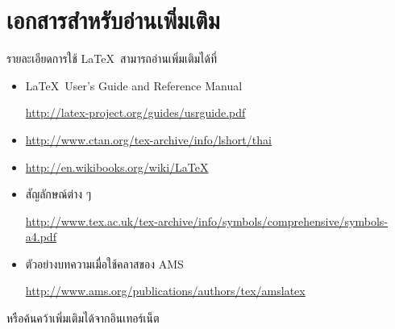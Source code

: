\section{เอกสารสำหรับอ่านเพิ่มเติม}
รายละเอียดการใช้ \LaTeX~สามารถอ่านเพิ่มเติมได้ที่
\begin{itemize}
	\item \LaTeX~User's Guide and Reference Manual 
	
	\url{http://latex-project.org/guides/usrguide.pdf}
	\item \url{http://www.ctan.org/tex-archive/info/lshort/thai}
	\item \url{http://en.wikibooks.org/wiki/LaTeX}
	\item สัญลักษณ์ต่าง ๆ
	
	\url{http://www.tex.ac.uk/tex-archive/info/symbols/comprehensive/symbols-a4.pdf}
	
	\item ตัวอย่างบทความเมื่อใช้คลาสของ AMS
	
	\url{http://www.ams.org/publications/authors/tex/amslatex}
	
\end{itemize}
หรือค้นคว้าเพิ่มเติมได้จากอินเทอร์เน็ต
